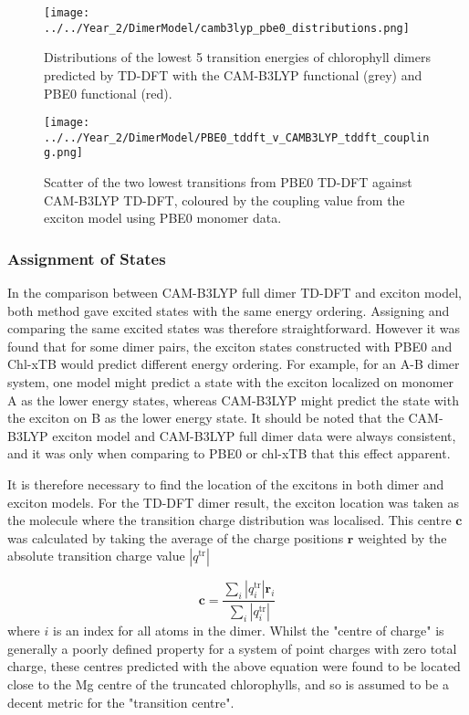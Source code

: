 \begin{figure}
    \centering
    \texttt{[image: ../../Year\_2/DimerModel/camb3lyp\_pbe0\_distributions.png]}
    \caption{Distributions of the lowest 5 transition energies of chlorophyll dimers 
    predicted by TD-DFT with the CAM-B3LYP functional (grey) and PBE0 functional (red).}
    \label{fig:camb3lyp_pbe0_distributions}
\end{figure}

\begin{figure}
    \centering
    \texttt{[image: ../../Year\_2/DimerModel/PBE0\_tddft\_v\_CAMB3LYP\_tddft\_coupling.png]}
    \caption{Scatter of the two lowest transitions from PBE0 TD-DFT against CAM-B3LYP
    TD-DFT, coloured by the coupling value from the exciton model using PBE0 monomer 
    data.}
    \label{fig:pbe0_camb3lyp_coupling}
\end{figure}

\afterpartskip
\subsubsection{Assignment of States}
\label{subsec:state_assign}

In the comparison between CAM-B3LYP full dimer TD-DFT and exciton model, both method
gave excited states with the same energy ordering. Assigning and comparing the same
excited states was therefore straightforward. However it was found that for some
dimer pairs, the exciton states constructed with PBE0 and Chl-xTB would predict 
different energy ordering. For example, for an A-B  dimer system, one model might
predict a state with the exciton localized on monomer A as the lower energy states,
whereas CAM-B3LYP might predict the state with the exciton on B as the lower energy 
state. It should be noted that the CAM-B3LYP exciton model and CAM-B3LYP full dimer
data were always consistent, and it was only when comparing to PBE0 or chl-xTB that
this effect apparent.

It is therefore necessary to find the location of the excitons in both dimer and
exciton models. For the TD-DFT dimer result, the exciton location was taken as the
molecule where the transition charge distribution was localised. This centre $\mathbf{c}$
was calculated by taking the average of the charge positions $\mathbf{r}$ weighted
by the absolute transition charge value $\left\lvert q^{\text{tr}} \right\rvert$

\begin{equation}
    \mathbf{c} = \frac{\sum_i \left\lvert q^{\text{tr}}_i \right\rvert \mathbf{r}_i}{\sum_i \left\lvert q^{\text{tr}}_i \right\rvert}
\end{equation}
%
where $i$ is an index for all atoms in the dimer. Whilst the "centre of charge"
is generally a poorly defined property for a system of point charges with zero total
charge, these centres predicted with the above equation were found to be located close
to the Mg centre of the truncated chlorophylls, and so is assumed to be a decent
metric for the "transition centre".

